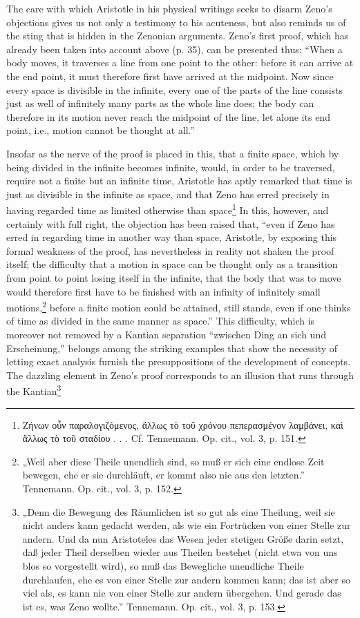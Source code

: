 \documentclass[12pt,a4paper,openany]{book}
\newcommand{\opage}[1]{\marginnote{\footnotesize\textit{[#1]}}}
\begin{document}
The care with which Aristotle in his physical writings seeks to disarm Zeno's objections gives us not only a testimony to his acuteness, but also reminds us of the sting that is hidden in the Zenonian arguments. Zeno's first proof, which has already been taken into account above (p. 35), can be presented thus: ``When a body moves, it traverses a line from one point to the other: before it can arrive at the end point, it must therefore first have arrived at the midpoint. Now since every space is divisible in the infinite, every one of the parts of the line consists just as well of infinitely many parts as the whole line does; the body can therefore in its motion never reach the midpoint of the line, let alone its end point, i.e., motion cannot be thought at all.''

Insofar as the nerve of the proof is placed in this, that a finite space, which by being divided in the infinite becomes infinite, would, in order to be traversed, require not a finite but an infinite time, Aristotle has aptly remarked that time is just as divisible in the infinite as space, and that Zeno has erred precisely in having regarded time as limited otherwise than space\footnote[2]{Ζήνων οὖν παραλογιζόμενος, ἄλλως τὸ τοῦ χρόνου πεπερασμένον λαμβάνει, καὶ ἄλλως τὸ τοῦ σταδίου . . . Cf. Tennemann. Op. cit., vol. 3, p. 151.} In this, however, and certainly with full right, the objection has been raised that, ``even if Zeno has erred in regarding time in another way than space, Aristotle, by exposing this formal weakness of the proof, has nevertheless in reality not shaken the proof itself; the difficulty that a motion in
\setcounter{footnote}{0}%
\opage{133}space can be thought only as a transition from point to point losing itself in the infinite, that the body that was to move would therefore first have to be finished with an infinity of infinitely small motions,\footnote[1]{„Weil aber diese Theile unendlich sind, so muß er sich eine endlose Zeit bewegen, ehe er sie durchläuft, er kommt also nie aus den letzten.'' Tennemann. Op. cit., vol. 3, p. 152.} before a finite motion could be attained, still stands, even if one thinks of time as divided in the same manner as space.'' This difficulty, which is moreover not removed by a Kantian separation ``zwischen Ding an sich und Erscheinung,'' belongs among the striking examples that show the necessity of letting exact analysis furnish the presuppositions of the development of concepts. The dazzling element in Zeno's proof corresponds to an illusion that runs through the Kantian\footnote[2]{„Denn die Bewegung des Räumlichen ist so gut als eine Theilung, weil sie nicht anders kann gedacht werden, als wie ein Fortrücken von einer Stelle zur andern. Und da nun Aristoteles das Wesen jeder stetigen Größe darin setzt, daß jeder Theil derselben wieder aus Theilen bestehet (nicht etwa von uns blos so vorgestellt wird), so muß das Bewegliche unendliche Theile durchlaufen, ehe es von einer Stelle zur andern kommen kann; das ist aber so viel als, es kann nie von einer Stelle zur andern übergehen. Und gerade das ist es, was Zeno wollte.'' Tennemann. Op. cit., vol. 3, p. 153.}
\end{document}
